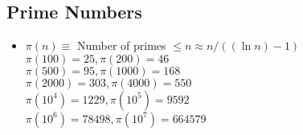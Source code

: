 \documentclass[a4paper,10pt,twocolumn,oneside]{article}
\begin{document}
\subsection{Prime Numbers}
{\normalsize
\begin{itemize}




\item $\pi(n) \equiv$ Number of primes $\leq n \approx n/((\ln n) - 1)$ \\
$\pi(100) = 25, \pi(200) = 46$ \\
$\pi(500) = 95, \pi(1000) = 168$ \\
$\pi(2000) = 303, \pi(4000) = 550$ \\
$\pi(10^4) = 1229, \pi(10^5) = 9592$ \\
$\pi(10^6) = 78498, \pi(10^7) = 664579$ \\
 
\end{itemize}
}

\newpage

\end{document}
